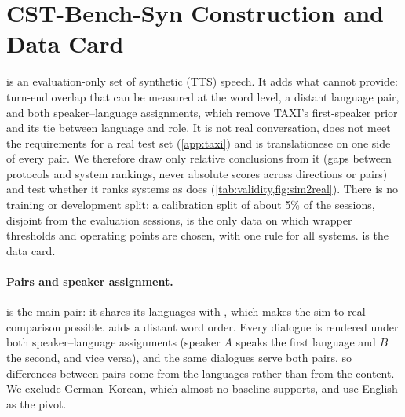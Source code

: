 \section{CST-Bench-Syn Construction and Data Card}\label{app:syn}


\syn is an evaluation-only set of synthetic (TTS) speech. It adds what \taxi cannot provide: turn-end overlap that can be measured at the word level, a distant language pair, and both speaker--language assignments, which remove TAXI's first-speaker prior and its tie between language and role. It is not real conversation, does not meet the requirements for a real test set (\cref{app:taxi}) and is translationese on one side of every pair. We therefore draw only relative conclusions from it (gaps between protocols and system rankings, never absolute scores across directions or pairs) and test whether it ranks systems as \taxi does (\cref{tab:validity,fig:sim2real}). There is no training or development split: a calibration split of about 5\% of the sessions, disjoint from the evaluation sessions, is the only data on which wrapper thresholds and operating points are chosen, with one rule for all systems.  is the data card.



\paragraph{Pairs and speaker assignment.}
 is the main pair: it shares its languages with \taxi, which makes the sim-to-real comparison possible.  adds a distant word order. Every dialogue is rendered under both speaker--language assignments (speaker $A$ speaks the first language and $B$ the second, and vice versa), and the same dialogues serve both pairs, so differences between pairs come from the languages rather than from the content. We exclude German--Korean, which almost no baseline supports, and use English as the pivot.

